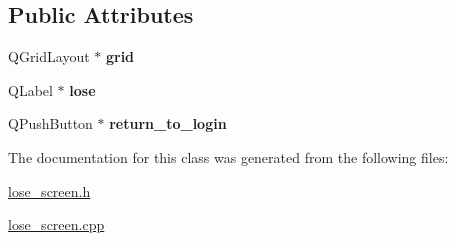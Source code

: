 \subsection*{Public Attributes}
\begin{DoxyCompactItemize}
\item 
\mbox{\label{classlose__screen_af9115788ae21e6456809d84e0f49e703}} 
Q\+Grid\+Layout $\ast$ {\bfseries grid}
\item 
\mbox{\label{classlose__screen_ac5b40c4bce6f5047658ca80059aa4400}} 
Q\+Label $\ast$ {\bfseries lose}
\item 
\mbox{\label{classlose__screen_a28c2c0d39d940edd66962907f78da527}} 
Q\+Push\+Button $\ast$ {\bfseries return\+\_\+to\+\_\+login}
\end{DoxyCompactItemize}


The documentation for this class was generated from the following files\+:\begin{DoxyCompactItemize}
\item 
\hyperlink{lose__screen_8h}{lose\+\_\+screen.\+h}\item 
\hyperlink{lose__screen_8cpp}{lose\+\_\+screen.\+cpp}\end{DoxyCompactItemize}
